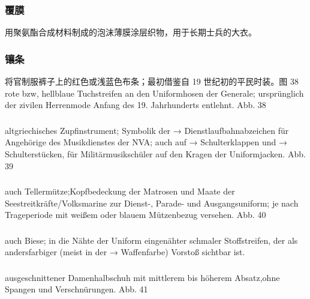 \subsubsection*{覆膜}%

用聚氨酯合成材料制成的泡沫薄膜涂层织物，用于长期士兵的大衣。

\subsubsection*{镶条}%

将官制服裤子上的红色或浅蓝色布条；最初借鉴自 19 世纪初的平民时装。图 38
rote bzw, hellblaue Tuchstreifen an den Uniformhosen der Generale; ursprünglich der zivilen Herrenmode Anfang des 19. Jahrhunderts entlehnt. Abb. 38

\subsubsection*{}%

altgriechisches Zupfinstrument; Symbolik der → Dienstlaufbahnabzeichen für Angehörige des Musikdienstes der NVA; auch auf → Schulterklappen und → Schulterstücken, für Militärmusikschüler auf den Kragen der Uniformjacken. Abb. 39

\subsubsection*{}%

auch Tellermütze;Kopfbedeckung der Matrosen und Maate der Seestreitkräfte/Volksmarine zur Dienst-, Parade- und Ausgangsuniform; je nach Trageperiode mit weißem oder blauem Mützenbezug versehen. Abb. 40

\subsubsection*{}%

auch Biese; in die Nähte der Uniform eingenähter schmaler Stoffstreifen, der als andersfarbiger (meist in der → Waffenfarbe) Vorstoß sichtbar ist.

\subsubsection*{}%

ausgeschnittener Damenhalbschuh mit mittlerem bis höherem Absatz,ohne Spangen und Verschnürungen. Abb. 41

